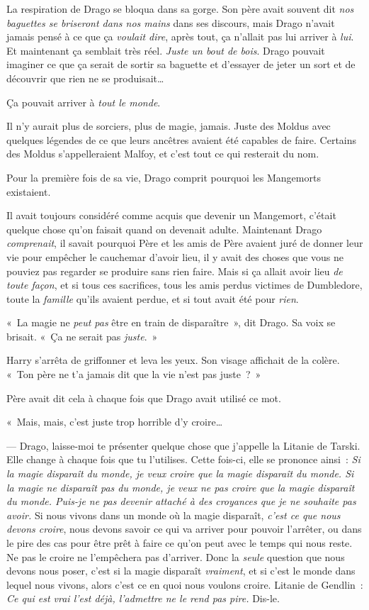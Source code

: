 La respiration de Drago se bloqua dans sa gorge. Son père avait souvent dit \emph{nos baguettes se briseront dans nos mains} dans ses discours, mais Drago n'avait jamais pensé à ce que ça \emph{voulait dire}, après tout, ça n'allait pas lui arriver à \emph{lui}. Et maintenant ça semblait très réel. \emph{Juste un bout de bois}. Drago pouvait imaginer ce que ça serait de sortir sa baguette et d'essayer de jeter un sort et de découvrir que rien ne se produisait…

Ça pouvait arriver à \emph{tout le monde}.

Il n'y aurait plus de sorciers, plus de magie, jamais. Juste des Moldus avec quelques légendes de ce que leurs ancêtres avaient été capables de faire. Certains des Moldus s'appelleraient Malfoy, et c'est tout ce qui resterait du nom.

Pour la première fois de sa vie, Drago comprit pourquoi les Mangemorts existaient.

Il avait toujours considéré comme acquis que devenir un Mangemort, c'était quelque chose qu'on faisait quand on devenait adulte. Maintenant Drago \emph{comprenait}, il savait pourquoi Père et les amis de Père avaient juré de donner leur vie pour empêcher le cauchemar d'avoir lieu, il y avait des choses que vous ne pouviez pas regarder se produire sans rien faire. Mais si ça allait avoir lieu \emph{de toute façon}, et si tous ces sacrifices, tous les amis perdus victimes de Dumbledore, toute la \emph{famille} qu'ils avaient perdue, et si tout avait été pour \emph{rien}.

«~La magie ne \emph{peut pas} être en train de disparaître~», dit Drago. Sa voix se brisait. «~Ça ne serait pas \emph{juste}.~»

Harry s'arrêta de griffonner et leva les yeux. Son visage affichait de la colère. «~Ton père ne t'a jamais dit que la vie n'est pas juste~?~»

Père avait dit cela à chaque fois que Drago avait utilisé ce mot.

«~Mais, mais, c'est juste trop horrible d'y croire…

--- Drago, laisse-moi te présenter quelque chose que j'appelle la Litanie de Tarski. Elle change à chaque fois que tu l'utilises. Cette fois-ci, elle se prononce ainsi~: \emph{Si la magie disparaît du monde, je veux croire que la magie disparaît du monde. Si la magie ne disparaît pas du monde, je veux ne pas croire que la magie disparaît du monde. Puis-je ne pas devenir attaché à des croyances que je ne souhaite pas avoir.} Si nous vivons dans un monde où la magie disparaît, \emph{c'est ce que nous devons croire}, nous devons savoir ce qui va arriver pour pouvoir l'arrêter, ou dans le pire des cas pour être prêt à faire ce qu'on peut avec le temps qui nous reste. Ne pas le croire ne l'empêchera pas d'arriver. Donc la \emph{seule} question que nous devons nous poser, c'est si la magie disparaît \emph{vraiment}, et si c'est le monde dans lequel nous vivons, alors c'est ce en quoi nous voulons croire. Litanie de Gendlin~: \emph{Ce qui est vrai l'est déjà, l'admettre ne le rend pas pire.} Dis-le.

